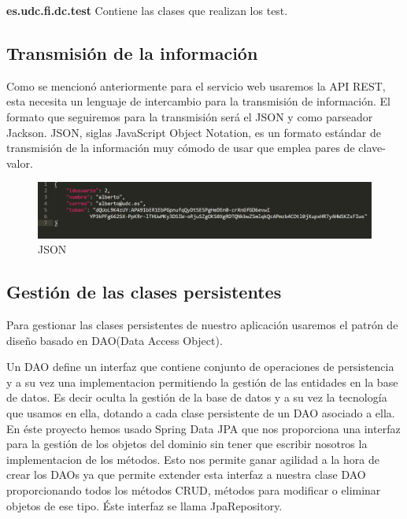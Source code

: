 \textbf{es.udc.fi.dc.test} Contiene las clases que realizan los test.
\subsection{Transmisión de la información}
Como se mencionó anteriormente para el servicio web usaremos la API REST, esta necesita un lenguaje de intercambio para la transmisión de información. El formato que seguiremos para la transmisión será el JSON y como parseador Jackson.
JSON, siglas JavaScript Object Notation, es un formato estándar de transmisión de la información muy cómodo de usar que emplea pares de clave-valor.
	\begin{figure}[H]
		\centering
		\includegraphics[width=\textwidth] {json.PNG}
		\caption{JSON }
		\label{fig:json}
	\end{figure}
\subsection{Gestión de las clases persistentes}
Para gestionar las clases persistentes de nuestro aplicación usaremos el patrón de diseño basado en DAO(Data Access Object).

 Un DAO define un interfaz que contiene conjunto de operaciones de persistencia y a su vez una implementacion permitiendo la gestión de las entidades en la base de datos. Es decir oculta la gestión de la base de datos y a su vez la tecnología que usamos en ella, dotando a cada clase persistente de un DAO asociado a ella. En éste proyecto hemos usado Spring Data JPA que nos proporciona una interfaz para la gestión de los objetos del dominio sin tener que escribir nosotros la implementacion de los métodos. Esto nos permite ganar agilidad a la hora de crear los DAOs ya que permite extender esta interfaz a nuestra clase DAO proporcionando todos los métodos CRUD, métodos para modificar o eliminar objetos de ese tipo. Éste interfaz se llama JpaRepository.\\


